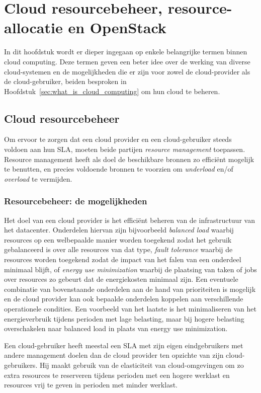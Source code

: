 \chapter{Cloud resourcebeheer, resource-allocatie en OpenStack}

In dit hoofdstuk wordt er dieper ingegaan op enkele belangrijke termen binnen cloud computing. Deze termen geven een beter idee over de werking van diverse cloud-systemen en de mogelijkheden die er zijn voor zowel de cloud-provider als de cloud-gebruiker, beiden besproken in Hoofdstuk~\ref{sec:what_is_cloud_computing} om hun cloud te beheren.

\section{Cloud resourcebeheer}
\label{sec:rmcloud}

Om ervoor te zorgen dat een cloud provider en een cloud-gebruiker steeds voldoen aan hun SLA, moeten beide partijen \textit{resource management} toepassen. Resource management heeft als doel de beschikbare bronnen zo efficiënt mogelijk te benutten, en precies voldoende bronnen te voorzien om \textit{underload} en/of \textit{overload} te vermijden.

\subsection{Resourcebeheer: de mogelijkheden}

Het doel van een cloud provider is het efficiënt beheren van de infrastructuur van het datacenter. Onderdelen hiervan zijn bijvoorbeeld \textit{balanced load} waarbij resources op een welbepaalde manier worden toegekend zodat het gebruik gebalanceerd is over alle resources van dat type, \textit{fault tolerance} waarbij de resources worden toegekend zodat de impact van het falen van een onderdeel minimaal blijft, of \textit{energy use minimization} waarbij de plaatsing van taken of jobs over resources zo gebeurt dat de energiekosten minimaal zijn. Een eventuele combinatie van bovenstaande onderdelen aan de hand van prioriteiten is mogelijk en de cloud provider kan ook bepaalde onderdelen koppelen aan verschillende operationele condities. Een voorbeeld van het laatste is het minimaliseren van het energieverbruik tijdens perioden met lage belasting, maar bij hogere belasting overschakelen naar balanced load in plaats van energy use minimization.

Een cloud-gebruiker heeft meestal een SLA met zijn eigen eindgebruikers met andere management doelen dan de cloud provider ten opzichte van zijn cloud-gebruikers. Hij maakt gebruik van de elasticiteit van cloud-omgevingen om zo extra resources te reserveren tijdens perioden met een hogere werklast en resources vrij te geven in perioden met minder werklast.

